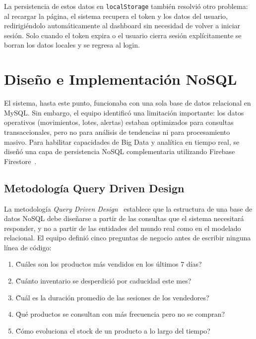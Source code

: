 \documentclass[journal]{IEEEtran}
\begin{document}
	La persistencia de estos datos en \texttt{localStorage}
	tambi\'{e}n resolvi\'{o} otro problema: al recargar la
	p\'{a}gina, el sistema recupera el token y los datos del
	usuario, redirigi\'{e}ndolo autom\'{a}ticamente al dashboard
	sin necesidad de volver a iniciar sesi\'{o}n. Solo cuando el
	token expira o el usuario cierra sesi\'{o}n expl\'{i}citamente
	se borran los datos locales y se regresa al login.
	


	\section{Dise\~{n}o e Implementaci\'{o}n NoSQL}
	\label{sec:nosql}
	
	El sistema, hasta este punto, funcionaba con una sola base de
	datos relacional en MySQL. Sin embargo, el equipo identific\'{o}
	una limitaci\'{o}n importante: los datos operativos
	(movimientos, lotes, alertas) estaban optimizados para
	consultas transaccionales, pero no para an\'{a}lisis de
	tendencias ni para procesamiento masivo. Para habilitar
	capacidades de Big Data y anal\'{i}tica en tiempo real, se
	dise\~{n}\'{o} una capa de persistencia NoSQL complementaria
	utilizando Firebase Firestore~\cite{GoogleFirebase:2025}.
	
	\subsection{Metodolog\'{i}a Query Driven Design}
	\label{subsec:qdd}
	
	La metodolog\'{i}a \textit{Query Driven Design}~\cite{Cattell:2011}
	establece que la estructura de una base de datos NoSQL debe
	dise\~{n}arse a partir de las consultas que el sistema
	necesitar\'{a} responder, y no a partir de las entidades del
	mundo real como en el modelado relacional. El equipo
	defini\'{o} cinco preguntas de negocio antes de escribir
	ninguna l\'{i}nea de c\'{o}digo:
	
	\begin{enumerate}[leftmargin=*, label=\arabic*., itemsep=2pt]
		\item \~{C}u\'{a}les son los productos m\'{a}s vendidos en los
		\'{u}ltimos 7 d\'{i}as?
		\item \~{C}u\'{a}nto inventario se desperdici\'{o} por
		caducidad este mes?
		\item \~{C}u\'{a}l es la duraci\'{o}n promedio de las sesiones
		de los vendedores?
		\item \~{Q}u\'{e} productos se consultan con m\'{a}s frecuencia
		pero no se compran?
		\item \~{C}\'{o}mo evoluciona el stock de un producto a lo
		largo del tiempo?
	\end{enumerate}
	
\end{document}
